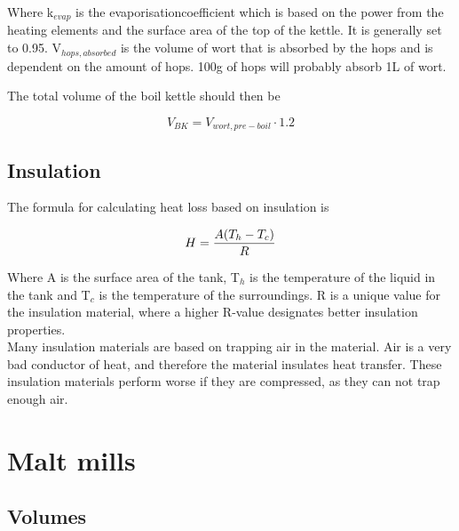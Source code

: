 \documentclass[11pt,fleqn]{book} %
\begin{document}
Where k$_{evap}$ is the evaporisationcoefficient which is based on the power from the heating elements and the surface area of the top of the kettle. It is generally set to 0.95. V$_{hops, absorbed}$ is the volume of wort that is absorbed by the hops and is dependent on the amount of hops. 100g of hops will probably absorb 1L of wort.

The total volume of the boil kettle should then be

\begin{equation}
V_{BK} = V_{wort, pre-boil} \cdot 1.2
\end{equation}

\section{Insulation}

The formula for calculating heat loss based on insulation is

\begin{equation}
H = {{A (T_h - T_c)} \over R}
\end{equation}

Where A is the surface area of the tank, T$_h$ is the temperature of the liquid in the tank and T$_c$ is the temperature of the surroundings. R is a unique value for the insulation material, where a higher R-value designates better insulation properties.\\

Many insulation materials are based on trapping air in the material. Air is a very bad conductor of heat, and therefore the material insulates heat transfer. These insulation materials perform worse if they are compressed, as they can not trap enough air.




\chapter{Malt mills}

\section{Volumes}


\end{document}
